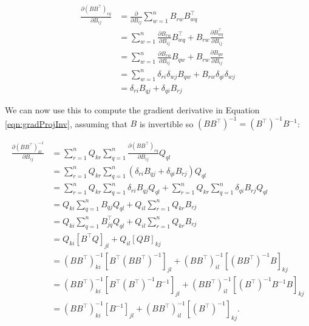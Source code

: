 \documentclass[12pt]{article}
\theoremstyle{definition}
\begin{document}
\begin{equation}
    \label{eqn:gradProjElement}
    \begin{split}
        \frac{\partial (BB^\top)_{rq}}{\partial B_{ij}} &= \frac{\partial}{\partial B_{ij}} \sum_{w=1}^{n} B_{rw}B_{wq}^\top \\ 
        &= \sum_{w=1}^{n} \frac{\partial B_{rw}}{\partial B_{ij}} B_{wq}^\top + B_{rw} \frac{\partial B_{wq}^\top}{\partial B_{ij}} \\
        & = \sum_{w=1}^{n} \frac{\partial B_{rw}}{\partial B_{ij}} B_{qw} + B_{rw} \frac{\partial B_{qw}}{\partial B_{ij}} \\ 
        & = \sum_{w=1}^{n} \delta_{ri} \delta_{wj} B_{qw} + B_{rw} \delta_{qi} \delta_{wj} \\ 
        & = \delta_{ri} B_{qj} + \delta_{qi} B_{rj}
    \end{split}
\end{equation}

We can now use this to compute the gradient derivative in Equation \ref{eqn:gradProjInv}, assuming that $B$ is invertible so $(BB^\top)^{-1} = (B^\top)^{-1} B^{-1}$:

\begin{equation}
    \label{eqn:gradProjInvFinal}
    \begin{split}
        \frac{\partial (BB^\top)^{-1}_{kl}}{\partial B_{ij}} &= \sum_{r=1}^{n} Q_{kr} \sum_{q=1}^{n} \frac{\partial (BB^\top)_{rq}}{\partial B_{ij}} Q_{ql} \\ 
        & = \sum_{r=1}^{n} Q_{kr} \sum_{q=1}^{n} (\delta_{ri} B_{qj} + \delta_{qi} B_{rj}) Q_{ql} \\
        & = \sum_{r=1}^{n} Q_{kr} \sum_{q=1}^{n} \delta_{ri} B_{qj} Q_{ql} + \sum_{r=1}^{n} Q_{kr} \sum_{q=1}^{n} \delta_{qi} B_{rj} Q_{ql} \\ 
        & = Q_{ki} \sum_{q=1}^{n} B_{qj} Q_{ql} + Q_{il} \sum_{r=1}^{n} Q_{kr} B_{rj}  \\ 
        & = Q_{ki} \sum_{q=1}^{n} B^\top_{jq} Q_{ql} + Q_{il} \sum_{r=1}^{n} Q_{kr} B_{rj}  \\ 
        & = Q_{ki} [B^\top Q]_{jl} + Q_{il} [QB]_{kj} \\ 
        & = (BB^\top)^{-1}_{ki} [B^\top (BB^\top)^{-1}]_{jl} + (BB^\top)^{-1}_{il} [(BB^\top)^{-1} B]_{kj} \\ 
        & = (BB^\top)^{-1}_{ki} [B^\top (B^\top)^{-1} B^{-1}]_{jl} + (BB^\top)^{-1}_{il} [(B^\top)^{-1} B^{-1} B]_{kj} \\ 
        & = (BB^\top)^{-1}_{ki} [B^{-1}]_{jl} + (BB^\top)^{-1}_{il} [(B^\top)^{-1}]_{kj}.
    \end{split}
\end{equation}
\end{document}
